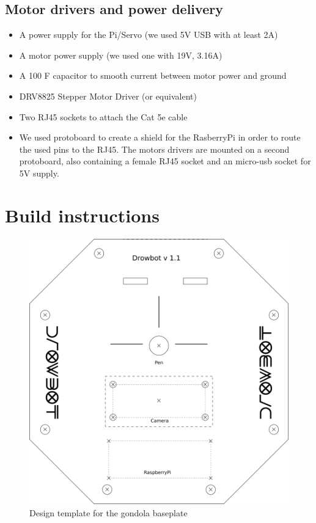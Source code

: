 \documentclass[a4paper,10pt]{article}
\begin{document}
\subsection*{Motor drivers and power delivery}
\begin{itemize}
  \item A power supply for the Pi/Servo (we used 5V USB with at least 2A)
  \item A motor power supply (we used one with 19V, 3.16A)
  \item A 100 \textmu F capacitor to smooth current between motor power and ground
  \item DRV8825 Stepper Motor Driver (or equivalent)
  \item Two RJ45 sockets to attach the Cat 5e cable
  \item We used protoboard to create a shield for the RasberryPi in order to route the used pins to the RJ45. The motors drivers are mounted on a second protoboard, also containing a female RJ45 socket and an micro-usb socket for 5V supply.
\end{itemize}

\section{Build instructions}
\label{sec:buildinst}


\begin{figure}[h!]
  \centering
  \includegraphics{img/gondola.png}
  \caption{Design template for the gondola baseplate}
  \label{fig:baseplate}
\end{figure}
\end{document}
